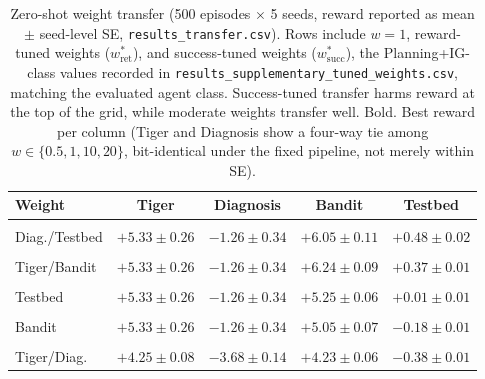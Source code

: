 \begin{table}[ht]
\centering
\caption{Zero-shot weight transfer (500 episodes $\times$ 5 seeds, reward reported as mean $\pm$ seed-level SE, \texttt{results\_\allowbreak transfer.csv}). Rows include $w{=}1$, reward-tuned weights ($w^*_{\mathrm{ret}}$), and success-tuned weights ($w^*_{\mathrm{succ}}$), the Planning+IG-class values recorded in \texttt{results\_\allowbreak supplementary\_\allowbreak tuned\_\allowbreak weights.csv}, matching the evaluated agent class. Success-tuned transfer harms reward at the top of the grid, while moderate weights transfer well. Bold. Best reward per column (Tiger and Diagnosis show a four-way tie among $w \in \{0.5, 1, 10, 20\}$, bit-identical under the fixed pipeline, not merely within SE).}
\label{tab:transfer}
\begin{tablebody}
\begin{tabular}{lcccc}
\toprule
Weight & Tiger & Diagnosis & Bandit & Testbed \\
\midrule
\shortstack[l]{$w{=}0.5$ ($w^*_{\mathrm{ret}}$)\\Diag./Testbed} & $\mathbf{+5.33 \pm 0.26}$ & $\mathbf{-1.26 \pm 0.34}$ & $+6.05 \pm 0.11$ & $\mathbf{+0.48 \pm 0.02}$ \\
\shortstack[l]{$w{=}1$ (EFE / $w^*_{\mathrm{ret}}$)\\Tiger/Bandit} & $\mathbf{+5.33 \pm 0.26}$ & $\mathbf{-1.26 \pm 0.34}$ & $\mathbf{+6.24 \pm 0.09}$ & $+0.37 \pm 0.01$ \\
\shortstack[l]{$w{=}10$ ($w^*_{\mathrm{succ}}$)\\Testbed} & $\mathbf{+5.33 \pm 0.26}$ & $\mathbf{-1.26 \pm 0.34}$ & $+5.25 \pm 0.06$ & $+0.01 \pm 0.01$ \\
\shortstack[l]{$w{=}20$ ($w^*_{\mathrm{succ}}$)\\Bandit} & $\mathbf{+5.33 \pm 0.26}$ & $\mathbf{-1.26 \pm 0.34}$ & $+5.05 \pm 0.07$ & $-0.18 \pm 0.01$ \\
\shortstack[l]{$w{=}50$ ($w^*_{\mathrm{succ}}$)\\Tiger/Diag.} & $+4.25 \pm 0.08$ & $-3.68 \pm 0.14$ & $+4.23 \pm 0.06$ & $-0.38 \pm 0.01$ \\
\bottomrule
\end{tabular}
\end{tablebody}
\end{table}

